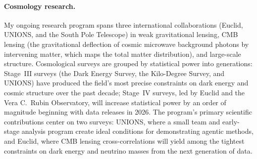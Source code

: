\documentclass[11pt, a4paper]{article}
\begin{document}
\paragraph{Cosmology research.}
My ongoing research program spans three international collaborations (Euclid, UNIONS, and the South Pole Telescope) in weak gravitational lensing, CMB lensing (the gravitational deflection of cosmic microwave background photons by intervening matter, which maps the total matter distribution), and large-scale structure.
Cosmological surveys are grouped by statistical power into generations: Stage~III surveys (the Dark Energy Survey, the Kilo-Degree Survey, and UNIONS) have produced the field's most precise constraints on dark energy and cosmic structure over the past decade; Stage~IV surveys, led by Euclid and the Vera C.\ Rubin Observatory, will increase statistical power by an order of magnitude beginning with data releases in 2026.
The program's primary scientific contributions center on two surveys: UNIONS, where a small team and early-stage analysis program create ideal conditions for demonstrating agentic methods, and Euclid, where CMB lensing cross-correlations will yield among the tightest constraints on dark energy and neutrino masses from the next generation of data.
\end{document}
